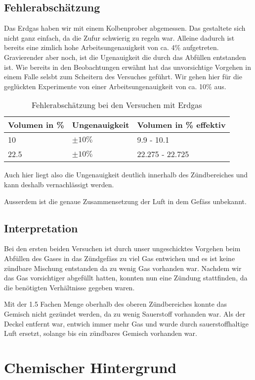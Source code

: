\documentclass[11pt,paper=a4,final]{scrartcl}
\begin{document}
\subsection{Fehlerabsch\"atzung}
Das Erdgas haben wir mit einem Kolbenprober abgemessen. Das gestaltete sich
nicht ganz einfach, da die Zufur schwierig zu regeln war. Alleine dadurch ist
bereits eine zimlich hohe Arbeitsungenauigkeit von ca. 4\% aufgetreten.
Gravierender aber noch, ist die Ugenauigkeit die durch das Abf\"ullen entstanden
ist. Wie bereits in den Beobachtungen erw\"ahnt hat das unvorsichtige Vorgehen
in einem Falle selsbt zum Scheitern des Versuches gef\"uhrt. Wir gehen hier
f\"ur die gegl\"uckten Experimente von einer Arbeitsungenauigkeit von ca. 10\%
aus.
\begin{table}[h!]
  \centering
  \begin{tabular}{|l|l|l|}\hline
    \bf Volumen in \%	& \bf Ungenauigkeit	& \bf Volumen in \% effektiv \\
    \hline
    10			& \(\pm 10\%\)		& 9.9 - 10.1 \\
    \hline
    22.5		& \(\pm 10\%\)		& 22.275 - 22.725 \\
    \hline
  \end{tabular}
  \caption{Fehlerabsch\"atzung bei den Versuchen mit Erdgas}
  \label{tab:}
\end{table}
Auch hier liegt also die Ungenauigkeit deutlich innerhalb des Z\"undbereiches
und kann deshalb vernachl\"assigt werden.

Ausserdem ist die genaue Zusammensetzung der Luft in dem Gef\"ass unbekannt.
\subsection{Interpretation}
Bei den ersten beiden Versuchen ist durch unser ungeschicktes Vorgehen beim
Abf\"ullen des Gases in das Z\"undgef\"ass zu viel Gas entwichen und es ist
keine z\"undbare Mischung entstanden da zu wenig Gas vorhanden war. Nachdem wir
das Gas vorsichtiger abgef\"ullt hatten, konnten nun eine Z\"undung stattfinden,
da die ben\"otigten Verh\"altnisse gegeben waren.

Mit der 1.5 Fachen Menge oberhalb des oberen Z\"undbereiches konnte das Gemisch
nicht gez\"undet werden, da zu wenig Sauerstoff vorhanden war. Als der Deckel
entfernt war, entwich immer mehr Gas und wurde durch sauerstoffhaltige Luft
ersetzt, solange bis ein z\"undbares Gemisch vorhanden war.

\section{Chemischer Hintergrund}
\end{document}

